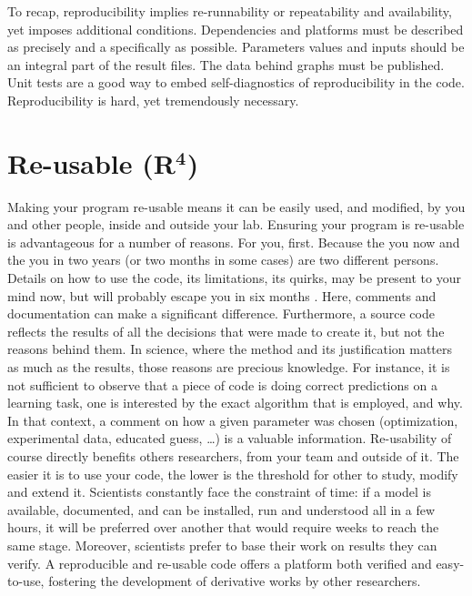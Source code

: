 \documentclass[a4paper,11pt]{article}
\begin{document}
To recap, reproducibility implies re-runnability or repeatability and
availability, yet imposes additional conditions. Dependencies and platforms
must be described as precisely and a specifically as possible. Parameters
values and inputs should be an integral part of the result files. The data
behind graphs must be published. Unit tests are a good way to embed
self-diagnostics of reproducibility in the code. Reproducibility is hard, yet
tremendously necessary.

\section*{Re-usable (R$^{\mathbf 4}$)}

Making your program re-usable means it can be easily used, and modified, by you
and other people, inside and outside your lab. Ensuring your program is
re-usable is advantageous for a number of reasons. For you, first. Because the
you now and the you in two years (or two months in some cases) are two
different persons. Details on how to use the code, its limitations, its quirks,
may be present to your mind now, but will probably escape you in six months
\parencite{Donoho:2009}. Here, comments and documentation can make a
significant difference.  Furthermore, a source code reflects the results of all
the decisions that were made to create it, but not the reasons behind them. In
science, where the method and its justification matters as much as the results,
those reasons are precious knowledge. For instance, it is not sufficient to
observe that a piece of code is doing correct predictions on a learning task,
one is interested by the exact algorithm that is employed, and why. In that
context, a comment on how a given parameter was chosen (optimization,
experimental data, educated guess, …) is a valuable information.
%
Re-usability of course directly benefits others researchers, from your team and
outside of it. The easier it is to use your code, the lower is the threshold
for other to study, modify and extend it. Scientists constantly face the
constraint of time: if a model is available, documented, and can be installed,
run and understood all in a few hours, it will be preferred over another that
would require weeks to reach the same stage.  Moreover, scientists prefer to
base their work on results they can verify. A reproducible and re-usable code
offers a platform both verified and easy-to-use, fostering the development of
derivative works by other researchers.\\
\end{document}

